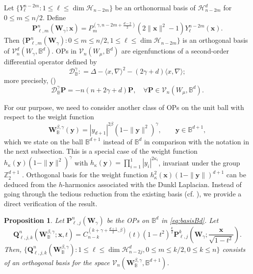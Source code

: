 \documentclass{amsart}
\newtheorem{prop}[thm]{Proposition}
\theoremstyle{remark}
\def\la{{\langle}}
\def\ra{{\rangle}}
\def\b{{\beta}}
\def\g{{\gamma}}
\def\k{{\kappa}}
\def\la{{\langle}}
\def\ra{{\rangle}}
\def\xb{{\mathbf x}}
\def\yb{{\mathbf y}}
\def\Pb{{\mathbf P}}
\def\Qb{{\mathbf Q}}
\def\Wb{{\mathbf W}}
\def\CD{{\mathcal D}}
\def\CH{{\mathcal H}}
\def\CV{{\mathcal V}}
\def\BB{{\mathbb B}}
\def\ZZ{{\mathbb Z}}
\def\f{\frac}
\begin{document}
Let $\{Y_\ell^{n-2m}: 1 \le \ell \le  \dim \CH_{n-2m}\}$ be an orthonormal basis of $\CH_{n-2m}^d$ for $ 0\le m \le n/2$. 
Define \cite[(5.2.4)]{DX}
\begin{equation}\label{eq:basisBd}
  \Pb_{\ell, m}^n (\Wb_\g; \xb) = P_m^{(\g, n-2m+\f{d-2}{2})} \left(2\|\xb\|^2-1\right) Y_{\ell}^{n-2m}(\xb).
\end{equation}
Then $\{\Pb_{\ell,m}^n(\Wb_\g): 0 \le m \le n/2, 1 \le \ell \le \dim \CH_{n-2m}\}$ is an orthogonal basis of 
$\CV_n^d(W_\g,\BB^d)$. OPs in $\CV_n(W_\mu, \BB^d)$ are eigenfunctions of a second-order differential operator 
defined by 
$$
   \CD_\BB^\g: = \Delta - \la x ,\nabla \ra^2 - (2\g + d) \la x, \nabla\ra; 
$$
more precisely, (\cite[(5.23)]{DX}) 
$$
  \CD_\BB^\g \Pb = - n(n+2\g+d) \Pb, \quad \forall \Pb \in  \CV_n(W_\mu,\BB^d).
$$

For our purpose, we need to consider another class of OPs on the unit ball with respect to the
weight function 
\begin{equation} \label{eq:WbgBB}
  \Wb_\BB^{\b,\g}(\yb) = |y_{d+1}|^{2\b} (1-\|\yb\|^2)^\g, \qquad  \yb \in \BB^{d+1},
\end{equation}
which we state on the ball $\BB^{d+1}$ instead of $\BB^d$ in comparison with the notation in the next subsection. 
This is a special case of the weight function $h_\k(\yb)(1-\|\yb\|^2)^\g$ with $h_\k(\yb) = \prod_{i=1}^{1} |y_i|^{2\k_i}$,
invariant under the group $\ZZ_2^{d+1}$ \cite[Section 8.1]{DX}. Orthogonal basis for the weight function 
$h_\k^2(\xb)(1-\|\yb\|)^{d+1}$ can be deduced from the $h$-harmonics associated with the Dunkl Laplacian. 
Instead of going through the tedious reduction from the existing basis (cf. \cite[Proposition 8.1.5]{DX}), we provide a direct
verification of the result. 

\begin{prop}  \label{prop:OP_Qb}
Let $\Pb_{\ell,j}^n(\Wb_\g)$ be the OPs on $\BB^d$ in \eqref{eq:basisBd}. Let 
\begin{equation} \label{eq:OP_Qb}
  \Qb_{\ell, j, k}^n (\Wb_\BB^{\b,\g}; \xb,t) = C_{n-k}^{(k+\g+\frac{d+1}{2}, \b)}(t) (1-t^2)^\frac{k}{2} 
     \Pb_{\ell, j}^k \left(\Wb_\g; \frac{\xb}{\sqrt{1-t^2}}\right).
\end{equation}
Then, $\{\Qb_{\ell,j,k}^n(\Wb_\BB^{\b,\g}):  1 \le \ell \le \dim \CH_{n-2j}^d, 0 \le m \le k/2, 0\le k \le n\}$ consists of an 
orthogonal basis for the space $\CV_n(\Wb_\BB^{\b,\g}, \BB^{d+1})$.
\end{prop}
\end{document}
